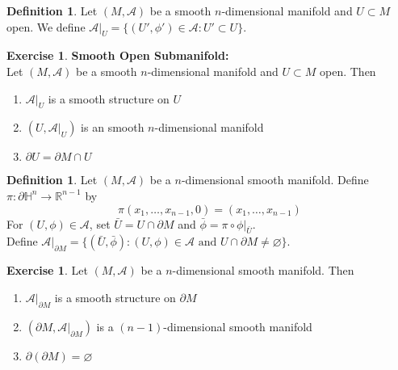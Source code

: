 \documentclass[12pt]{amsart}
\theoremstyle{definition}
\newtheorem{defn}[definition]{Definition}
\newtheorem{ex}[definition]{Exercise}
\renewcommand{\H}{\mathbb{H}}
\newcommand{\R}{\mathbb{R}}
\newcommand{\MA}{\mathcal{A}}
\newcommand{\p}{\partial}
\begin{document}
	\begin{defn}
		Let $(M, \MA)$ be a smooth $n$-dimensional manifold and $U \subset M$ open. We define $\MA|_{U} = \{(U', \phi') \in \MA: U' \subset U\}$. 
	\end{defn}

	\begin{ex} \textbf{Smooth Open Submanifold:} \\
		Let $(M, \MA)$ be a smooth $n$-dimensional manifold and $U \subset M$ open. Then 
		\begin{enumerate}
			\item $\MA|_{U}$ is a smooth structure on $U$
			\item $(U, \MA|_{U})$ is an smooth $n$-dimensional manifold
			\item $\p U = \p M \cap U$
		\end{enumerate}
	\end{ex}

	\begin{defn} 
		Let $(M, \MA)$ be a $n$-dimensional smooth manifold. Define $\pi: \p \H^n \rightarrow \R^{n-1}$ by 
		$$\pi(x_1, \ldots, x_{n-1}, 0) = (x_1, \ldots, x_{n-1})$$
		For $(U, \phi) \in \MA$, set $\bar{U} = U \cap \p M$ and $\bar{\phi} = \pi \circ \phi|_{\bar{U}}$. \\
		Define $\MA|_{\p M} = \{(\bar{U}, \bar{\phi}): (U, \phi) \in \MA \text{ and } U \cap \p M \neq \varnothing \}$.
	\end{defn}
	
	\begin{ex}
		Let $(M, \MA)$ be a $n$-dimensional smooth manifold. Then 
		\begin{enumerate}
			\item $\MA|_{\p M}$ is a smooth structure on $\p M$  
			\item $(\p M, \MA|_{\p M})$ is a $(n-1)$-dimensional smooth manifold
			\item $\partial (\partial M) = \varnothing$
		\end{enumerate}
	\end{ex}
	
\end{document}
